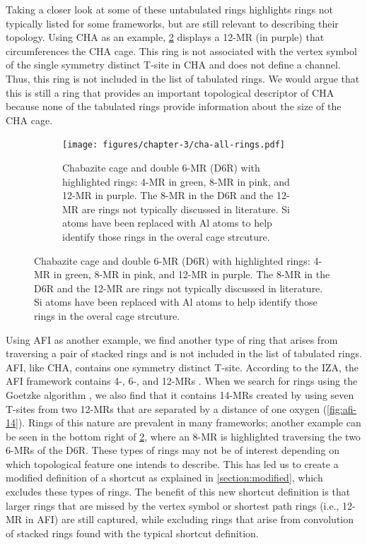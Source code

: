\documentclass[preprint,numrefs,noinfo,sort&compress]{elsarticle}
\begin{document}
Taking a closer look at some of these untabulated rings highlights rings not typically listed for some frameworks, but are still relevant to describing their topology. Using CHA as an example, \cref{fig:cha-rings} displays a 12-MR (in purple) that circumferences the CHA cage. This ring is not associated with the vertex symbol of the single symmetry distinct T-site in CHA and does not define a channel. Thus, this ring is not included in the list of tabulated rings. We would argue that this is still a ring that provides an important topological descriptor of CHA because none of the tabulated rings provide information about the size of the CHA cage. 

\begin{figure}
\begin{figure}[H]
\centering
\texttt{[image: figures/chapter-3/cha-all-rings.pdf]}
\caption{Chabazite cage and double 6-MR (D6R) with highlighted rings: 4-MR in green, 8-MR in pink, and 12-MR in purple. The 8-MR in the D6R and the 12-MR are rings not typically discussed in literature. Si atoms have been replaced with Al atoms to help identify those rings in the overal cage strcuture. \label{fig:cha-rings}}
\end{figure}
\end{figure}

Using AFI as another example, we find another type of ring that arises from traversing a pair of stacked rings and is not included in the list of tabulated rings. AFI, like CHA, contains one symmetry distinct T-site. According to the IZA, the AFI framework contains 4-, 6-, and 12-MRs \cite{baerlocher-database-nodate}. When we search for rings using the Goetzke algorithm \cite{goetzke-properties-1991}, we also find that it contains 14-MRs created by using seven T-sites from two 12-MRs that are separated by a distance of one oxygen (\cref{fig:afi-14}). Rings of this nature are prevalent in many frameworks; another example can be seen in the bottom right of \cref{fig:cha-rings}, where an 8-MR is highlighted traversing the two 6-MRs of the D6R. These types of rings may not be of interest depending on which topological feature one intends to describe. This has led us to create a modified definition of a shortcut as explained in \cref{section:modified}, which excludes these types of rings. The benefit of this new shortcut definition is that larger rings that are missed by the vertex symbol or shortest path rings (i.e., 12-MR in AFI) are still captured, while excluding rings that arise from convolution of stacked rings found with the typical shortcut definition.
\end{document}
